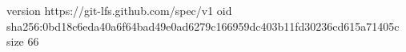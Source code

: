 version https://git-lfs.github.com/spec/v1
oid sha256:0bd18c6eda40a6f64bad49e0ad6279c166959dc403b11fd30236cd615a71405c
size 66
